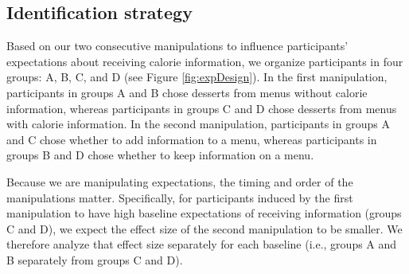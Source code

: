 \subsection{Identification strategy}

Based on our two consecutive manipulations to influence participants’ expectations about receiving calorie information, we organize participants in four groups: A, B, C, and D (see Figure \ref{fig:expDesign}). In the first manipulation, participants in groups A and B chose desserts from menus without calorie information, whereas participants in groups C and D chose desserts from menus with calorie information. In the second manipulation, participants in groups A and C chose whether to add information to a menu, whereas participants in groups B and D chose whether to keep information on a menu.

Because we are manipulating expectations, the timing and order of the manipulations matter. Specifically, for participants induced by the first manipulation to have high baseline expectations of receiving information (groups C and D), we expect the effect size of the second manipulation to be smaller. We therefore analyze that effect size separately for each baseline (i.e., groups A and B separately from groups C and D).

